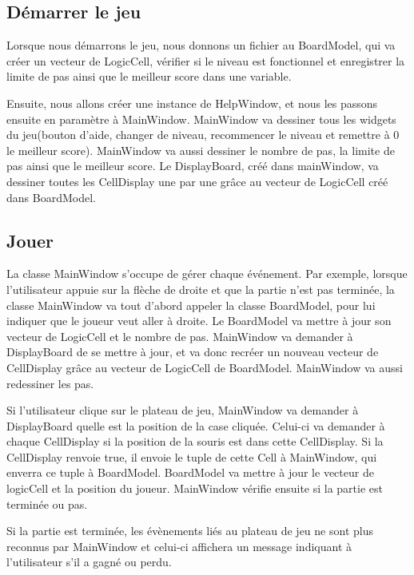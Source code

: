 \documentclass[utf8]{article}
\begin{document}
\begin{large}
\subsection{Démarrer le jeu}
\indent
\par

Lorsque nous démarrons le jeu, nous donnons un fichier au BoardModel, qui va
créer un vecteur de LogicCell, vérifier si le niveau est fonctionnel et
enregistrer la limite de pas ainsi que le meilleur score dans une variable.
\par
Ensuite, nous allons créer une instance de HelpWindow, et nous les passons
ensuite en paramètre à MainWindow. MainWindow va dessiner tous les widgets du
jeu(bouton d'aide, changer de niveau, recommencer le niveau et remettre à 0 le
meilleur score). MainWindow va aussi dessiner le nombre de pas, la limite de pas
ainsi que le meilleur score. Le DisplayBoard, créé dans mainWindow, va dessiner
toutes les CellDisplay une par une grâce au vecteur de LogicCell créé dans
BoardModel. 


\par
\subsection{Jouer}
\indent
\par
La classe MainWindow s'occupe de gérer chaque événement. Par exemple, lorsque
l'utilisateur appuie sur la flèche de droite et que la partie n'est pas
terminée, la classe MainWindow va tout d'abord appeler la classe BoardModel,
pour lui indiquer que le joueur veut aller à droite. Le BoardModel va mettre à
jour son vecteur de LogicCell et le nombre de pas. MainWindow va demander à
DisplayBoard de se mettre à jour, et va donc recréer un nouveau vecteur de
CellDisplay grâce au vecteur de LogicCell de BoardModel. MainWindow va aussi
redessiner les pas. 
\par
Si l'utilisateur clique sur le plateau de jeu, MainWindow va demander à
DisplayBoard quelle est la position de la case cliquée. Celui-ci va demander à
chaque CellDisplay si la position de la souris est dans cette CellDisplay. Si la
CellDisplay renvoie true, il envoie le tuple de cette Cell à MainWindow, qui
enverra ce tuple à BoardModel. BoardModel va mettre à jour le vecteur de
logicCell et la position du joueur. MainWindow vérifie ensuite si la partie est
terminée ou pas.
\par
Si la partie est terminée, les évènements liés au plateau de jeu ne sont plus
reconnus par MainWindow et celui-ci affichera un message indiquant à
l'utilisateur s'il a gagné ou perdu.
\par


\end{large}
\end{document}
